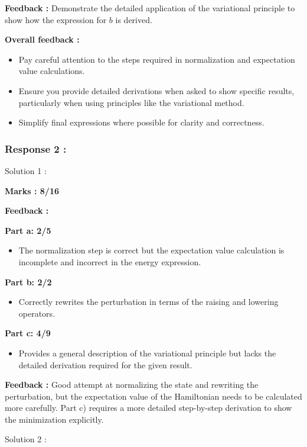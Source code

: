 \documentclass[a4paper,11pt]{article}
\begin{document}
\textbf{Feedback :}
Demonstrate the detailed application of the variational principle to show how the expression for $b$ is derived.

\textbf{Overall feedback :}
\begin{itemize}
    \item Pay careful attention to the steps required in normalization and expectation value calculations.
    \item Ensure you provide detailed derivations when asked to show specific results, particularly when using principles like the variational method.
    \item Simplify final expressions where possible for clarity and correctness.
\end{itemize}



\subsubsection*{Response 2 :}

Solution 1 :

\textbf{Marks : 8/16}

\textbf{Feedback :}

\textbf{Part a: 2/5}
\begin{itemize}
    \item The normalization step is correct but the expectation value calculation is incomplete and incorrect in the energy expression.
\end{itemize}

\textbf{Part b: 2/2}
\begin{itemize}
    \item Correctly rewrites the perturbation in terms of the raising and lowering operators.
\end{itemize}

\textbf{Part c: 4/9}
\begin{itemize}
    \item Provides a general description of the variational principle but lacks the detailed derivation required for the given result.
\end{itemize}

\textbf{Feedback :}
Good attempt at normalizing the state and rewriting the perturbation, but the expectation value of the Hamiltonian needs to be calculated more carefully. Part c) requires a more detailed step-by-step derivation to show the minimization explicitly.


Solution 2 :
\end{document}
